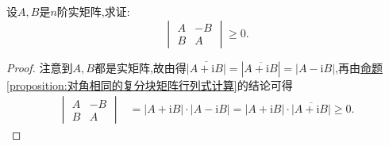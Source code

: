 \documentclass[../../main.tex]{subfiles}%
\begin{document}
\begin{example}
设\(A,B\)是\(n\)阶实矩阵,求证:
\[
\begin{vmatrix}
A & -B\\
B & A
\end{vmatrix}\geqslant 0.
\]
\end{example}
\begin{proof}

注意到\(A,B\)都是实矩阵,故由得\(\overline{|A + \mathrm{i}B|}=|\overline{A + \mathrm{i}B}|=|A - \mathrm{i}B|\),再由\hyperref[proposition:对角相同的复分块矩阵行列式计算]{命题\ref{proposition:对角相同的复分块矩阵行列式计算}}的结论可得
\begin{align*}
\begin{vmatrix}
A & -B\\
B & A
\end{vmatrix}&=|A + \mathrm{i}B|\cdot|A - \mathrm{i}B|=|A + \mathrm{i}B|\cdot\overline{|A + \mathrm{i}B|}\geqslant 0.
\end{align*}

\end{proof}
\end{document}
